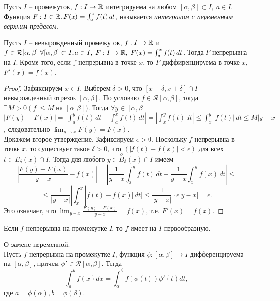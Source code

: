     \begin{definition}
        Пусть $I$ -- промежуток, $f: I \to \mathbb{R}$ интегрируема на любом $[\alpha, \beta] \subset I, \ a \in I$.
        Функция $F: I \in \mathbb{R}, F(x) = \int_a^x f(t) \,dt$, называется \textit{интегралом с переменным верхним пределом.}
    \end{definition}
    
    \begin{theorem}
        Пусть $I$ -- невырожденный промежуток, $f: I \to \mathbb{R}$
        и $f \in \mathcal{R}[\alpha, \beta] \ \forall [\alpha, \beta] \subset I, a \in I, \ F : I \to \mathbb{R},
        \ F(x) = \int_a^x f(t) \,dt$. Тогда $F$ непрерывна на $I$.
        Кроме того, если $f$ непрерывна в точке $x$, то $F$ диффиренцируема в точке $x$, $F'(x) = f(x)$.
    \end{theorem}
    
    \begin{proof}
        Зафиксируем $x \in I$.
        Выберем $\delta > 0$, что $[x-\delta, x+\delta] \cap I$ -- невырожденный отрезок $[\alpha, \beta]$.
        По условию $f \in \mathcal{R}[\alpha, \beta]$,
        тогда $\exists M > 0 \ (|f| \leq M$ на $[\alpha, \beta])$.
        Тогда $\forall y \in [\alpha, \beta]$
        \(|F(y) - F(x)| = |\int_a^y f(t) \,dt - \int_a^x f(t) \,dt| = 
        |\int_x^y f(t) \,dt| \leq \int_x^y |f(t)| \,dt \leq M|y-x|\),
        следовательно \(\lim_{y \to x} F(y) = F(x)\).\\
        Докажем второе утверждение. Зафиксируем $\epsilon > 0$. Поскольку $f$ непрерывна в точке $x$, то существует такое $\delta > 0$, что $(|f(t) - f(x)| < \epsilon)$ для всех $t \in B_{\delta}(x) \cap I$. Тогда для любого $y \in \overset{o}{B}_{\delta}(x) \cap I$ имеем
        \[|\frac{F(y) - F(x)}{y - x} - f(x)| = |\frac{1}{y - x} \int_{x}^{y} f(t) \,dt - \frac{1}{y - x} \int_{x}^{y} f(x) \,dt| \leq\]
        \[\leq \frac{1}{|y - x|} |\int_{x}^{y}|f(t) - f(x)| \,dt| \leq \frac{1}{|y-x|}\cdot \epsilon |y - x| = \epsilon.\]
        Это означает, что $\lim_{y - x} \frac{F(y) - F(x)}{y - x} = f(x)$, т.е. $F'(x) = f(x)$.
    \end{proof}
    
    \begin{corollary}
        Если $f$ непрерывна на промежутке $I$, то $f$ имеет на $I$ первообразную.
    \end{corollary}

    \begin{theorem}{О замене переменной.}\\
        Пусть $f$ непрерывна на промежутке $I$, функция $\phi: [\alpha, \beta] \to I$ дифференцируема на $[\alpha, \beta]$, причем $\phi' \in \mathcal{R}[\alpha, \beta]$. Тогда
        \[\int_{a}^{b}f(x)dx = \int_{\alpha}^{\beta}f(\phi(t))\phi'(t)dt,\]
        где $a = \phi(\alpha), b = \phi(\beta).$
    \end{theorem}
    
